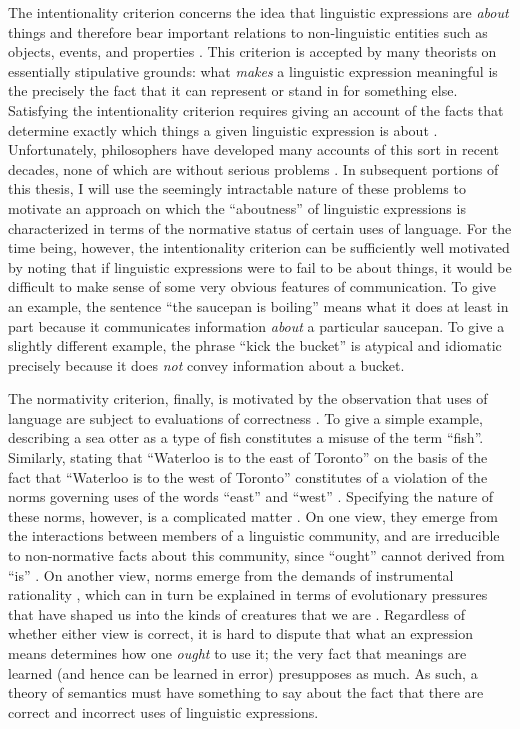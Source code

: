 The intentionality criterion concerns the idea that linguistic expressions are \textit{about} things and therefore bear important relations to non-linguistic entities such as objects, events, and properties \citep{Speaks:2014,Stanley:2008}. This criterion is accepted by many theorists on essentially stipulative grounds: what \textit{makes} a linguistic expression meaningful is the precisely the fact that it can represent or stand in for something else. Satisfying the intentionality criterion requires giving an account of the facts that determine exactly which things a given linguistic expression is about \citep{Horwich:1998,Brandom:2000}. Unfortunately, philosophers have developed many accounts of this sort in recent decades, none of which are without serious problems \citep{Horwich:1998,Horwich:2005}. In subsequent portions of this thesis, I will use the seemingly intractable nature of these problems to motivate an approach on which the ``aboutness'' of linguistic expressions is characterized in terms of the normative status of certain uses of language. For the time being, however, the intentionality criterion can be sufficiently well motivated by noting that if linguistic expressions were to fail to be about things, it would be difficult to make sense of some very obvious features of communication. To give an example, the sentence ``the saucepan is boiling'' means what it does at least in part because it communicates information \textit{about} a particular saucepan. To give a slightly different example, the phrase ``kick the bucket'' is atypical and idiomatic precisely because it does \textit{not} convey information about a bucket.
 
The normativity criterion, finally, is motivated by the observation that uses of language are subject to evaluations of correctness \citep{Wittgenstein:1953,Brandom:1994,Brandom:2000,Brandom:2009,Sellars:1953}. To give a simple example, describing a sea otter as a type of fish constitutes a misuse of the term ``fish''. Similarly, stating that ``Waterloo is to the east of Toronto'' on the basis of the fact that ``Waterloo is to the west of Toronto'' constitutes of a violation of the norms governing uses of the words ``east'' and ``west'' \citep[i.e. they are not synonyms; see][p. 98]{Brandom:1994}. Specifying the nature of these norms, however, is a complicated matter \citep{Brandom:1994,Kripke:1982}. On one view, they emerge from the interactions between members of a linguistic community, and are irreducible to non-normative facts about this community, since ``ought'' cannot derived from ``is'' \citep{Brandom:1994}. On another view, norms emerge from the demands of instrumental rationality \citep{Horwich:1998}, which can in turn be explained in terms of evolutionary pressures that have shaped us into the kinds of creatures that we are \citep{Dennett:1987,Dennett:2010}. Regardless of whether either view is correct, it is hard to dispute that what an expression means determines how one \textit{ought} to use it; the very fact that meanings are learned (and hence can be learned in error) presupposes as much. As such, a theory of semantics must have something to say about the fact that there are correct and incorrect uses of linguistic expressions.

